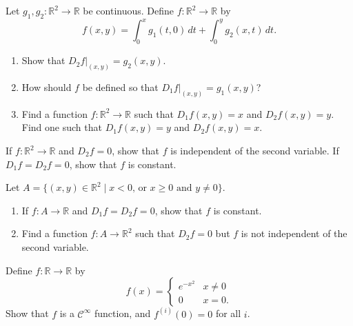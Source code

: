 \documentclass[12 pt, letterpaper]{hmcpset}
\begin{document}
\begin{problem}[21.]
	Let $g_{1}, g_{2} : \mathbb{R}^{2} \to \mathbb{R}$ be continuous. Define $f : \mathbb{R}^{2} \to \mathbb{R}$ by
	\[
		f(x, y) = \int_{0}^{x} g_{1}(t, 0) \, dt + \int_{0}^{y} g_{2}(x, t) \, dt.
	\]
	\begin{enumerate}
		\item Show that $D_{2} f \Big |_{(x, y)} = g_{2}(x, y)$.
		\item How should $f$ be defined so that $D_{1} f \Big |_{(x, y)} = g_{1}(x, y)$?
		\item Find a function $f : \mathbb{R}^{2} \to \mathbb{R}$ such that $D_{1} f(x, y) = x$ and $D_{2} f(x, y) = y$. Find one such that $D_{1} f(x, y) = y$ and $D_{2} f(x, y) = x$.
	\end{enumerate}
\end{problem}

\pagebreak

\begin{problem}[22.]
	If $f : \mathbb{R}^{2} \to \mathbb{R}$ and $D_{2} f = 0$, show that $f$ is independent of the second variable. If $D_{1} f = D_{2} f = 0$, show that $f$ is constant.
\end{problem}

\pagebreak

\begin{problem}[23.] 
	Let $A = \{ (x, y) \in \mathbb{R}^{2} \mid x < 0 \text{, or } x \ge 0 \text{ and } y \neq 0 \}$.
	\begin{enumerate}
		\item If $f : A \to \mathbb{R}$ and $D_{1} f = D_{2} f = 0$, show that $f$ is constant.
		\item Find a function $f : A \to \mathbb{R}^{2}$ such that $D_{2} f = 0$ but $f$ is not independent of the second variable.
	\end{enumerate}
\end{problem}

\pagebreak

\begin{problem}[25.]
	Define $f : \mathbb{R} \to \mathbb{R}$ by
	\[
		f(x) = \begin{cases}
			e^{-x^{2}} & x \neq 0 \\
			0 & x = 0.
		\end{cases}
	\]
	Show that $f$ is a $\mathcal{C}^{\infty}$ function, and $f^{(i)}(0) = 0$ for all $i$.
\end{problem}

\pagebreak
\end{document}
